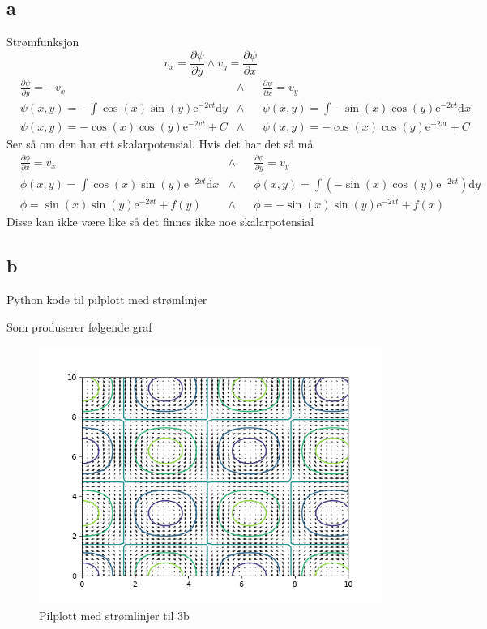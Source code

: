 \documentclass[a4paper,10pt,norsk]{article}
\newcommand{\dd}[1]{\mathrm{d}#1}
\begin{document}
	\subsection*{a}
		Strømfunksjon \[
		v_x = \frac{\partial \psi}{\partial y}  \wedge v_y = \frac{\partial \psi}{\partial x} 
		\] 
		\begin{align*}
			& \frac{\partial \psi}{\partial y} = -v_x
			& \wedge &
			& \frac{\partial \psi}{\partial x} = v_y\\
			& \psi (x,y) = - \int \cos(x) \sin(y) \mathrm{e} ^{-2vt} \dd{y}
			& \wedge &
			& \psi (x,y) = \int -\sin(x) \cos(y) \mathrm{e}^{-2vt} \dd{x}\\
			& \psi (x,y) = - \cos(x) \cos(y)  \mathrm{e}^{-2vt} + C
			& \wedge &
			& \psi (x,y) = - \cos(x) \cos(y)  \mathrm{e}^{-2vt} + C
		\end{align*}
		Ser så om den har ett skalarpotensial. Hvis det har det så må 
		\begin{align*}
			&\frac{\partial \phi}{\partial x} = v_x 
			&\wedge & 
			&\frac{\partial \phi}{\partial y} = v_y \\
			& \phi(x,y) = \int \cos(x) \sin(y) \mathrm{e}^{-2vt} \dd{x}
			& \wedge &
			& \phi(x,y) = \int \left( -\sin(x) \cos(y) \mathrm{e}^{-2vt} \right) \dd{y}\\
			& \phi = \sin(x) \sin(y) \mathrm{e}^{-2vt} + f(y)
			& \wedge &
			& \phi = - \sin(x) \sin(y) \mathrm{e}^{-2vt} + f(x)
		\end{align*}
		Disse kan ikke være like så det finnes ikke noe skalarpotensial
	
	\subsection*{b}
		Python kode til pilplott med strømlinjer

		Som produserer følgende graf
		\begin{figure}[h!]
			\centering
			\caption{Pilplott med strømlinjer til 3b}
			\label{fig:3b}
			\includegraphics{3b.png}
		\end{figure}
		\newpage
		
\end{document}
